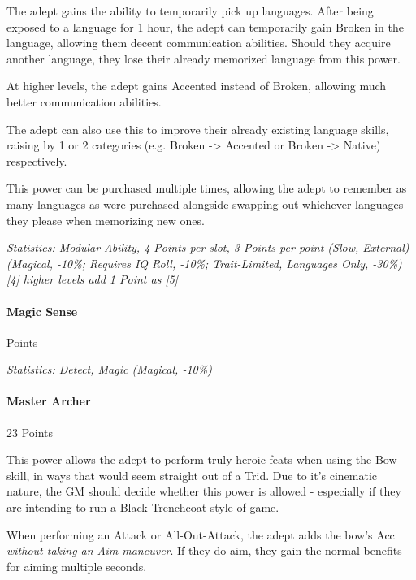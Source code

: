 \begin{multicols*}{3}
		The adept gains the ability to temporarily pick up languages. After being exposed to a language for 1 hour, the adept can temporarily gain Broken in the language, allowing them decent communication abilities. Should they acquire another language, they lose their already memorized language from this power.
		
		At higher levels, the adept gains Accented instead of Broken, allowing much better communication abilities.
		
		The adept can also use this to improve their already existing language skills, raising by 1 or 2 categories (e.g. Broken -> Accented or Broken -> Native) respectively.
		
		This power can be purchased multiple times, allowing the adept to remember as many languages as were purchased alongside swapping out whichever languages they please when memorizing new ones.

		\textcolor{OliveGreen}{\textit{Statistics: Modular Ability, 4 Points per slot, 3 Points per point (Slow, External) (Magical, -10\%; Requires IQ Roll, -10\%; Trait-Limited, Languages Only, -30\%) [4] higher levels add 1 Point as [5]}}
	
	\paragraph{Magic Sense}
	\begin{flushright}
		Points
	\end{flushright}

		\textcolor{OliveGreen}{\textit{Statistics: Detect, Magic (Magical, -10\%) }}
	
	\paragraph{Master Archer}
	\begin{flushright}
		23 Points
	\end{flushright}

		This power allows the adept to perform truly heroic feats when using the Bow skill, in ways that would seem straight out of a Trid. Due to it's cinematic nature, the GM should decide whether this power is allowed - especially if they are intending to run a Black Trenchcoat style of game.
		
		When performing an Attack or All-Out-Attack, the adept adds the bow's Acc \textit{without taking an Aim maneuver}. If they do aim, they gain the normal benefits for aiming multiple seconds.
		

\end{multicols*}
